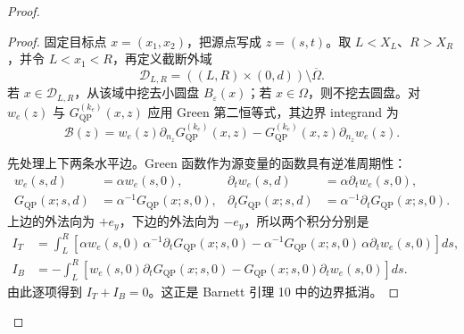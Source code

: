 \documentclass[UTF8,11pt,fontset=fandol]{ctexart}
\newcommand{\Om}{\Omega}
\newcommand{\QP}{\mathrm{QP}}
\theoremstyle{plain}
\theoremstyle{definition}
\theoremstyle{remark}
\begin{document}
\begin{proof}
\begin{proof}
固定目标点 \(x=(x_1,x_2)\)，把源点写成 \(z=(s,t)\)。取
\(L<X_L\)、\(R>X_R\)，并令 \(L<x_1<R\)，再定义截断外域
\[
\mathcal D_{L,R}=((L,R)\times(0,d))\setminus\overline\Om.
\]
若 \(x\in\mathcal D_{L,R}\)，从该域中挖去小圆盘 \(B_\varepsilon(x)\)；若
\(x\in\Om\)，则不挖去圆盘。对 \(w_e(z)\) 与
\(G_{\QP}^{(k_e)}(x,z)\) 应用 Green 第二恒等式，其边界 integrand 为
\[
\mathcal B(z)
=w_e(z)\partial_{n_z}G_{\QP}^{(k_e)}(x,z)
 -G_{\QP}^{(k_e)}(x,z)\partial_{n_z}w_e(z).
\]

先处理上下两条水平边。Green 函数作为源变量的函数具有逆准周期性：
\[
\begin{aligned}
w_e(s,d)&=\alpha w_e(s,0),
&\partial_t w_e(s,d)&=\alpha\partial_t w_e(s,0),\\
G_{\QP}(x;s,d)&=\alpha^{-1}G_{\QP}(x;s,0),
&\partial_tG_{\QP}(x;s,d)&=\alpha^{-1}\partial_tG_{\QP}(x;s,0).
\end{aligned}
\]
上边的外法向为 \(+e_y\)，下边的外法向为 \(-e_y\)，所以两个积分分别是
\[
\begin{aligned}
I_T
&=\int_L^R\left[
 \alpha w_e(s,0)\,\alpha^{-1}\partial_tG_{\QP}(x;s,0)
 -\alpha^{-1}G_{\QP}(x;s,0)\,\alpha\partial_tw_e(s,0)
 \right]ds,\\
I_B
&=-\int_L^R\left[
 w_e(s,0)\partial_tG_{\QP}(x;s,0)
 -G_{\QP}(x;s,0)\partial_tw_e(s,0)
 \right]ds.
\end{aligned}
\]
由此逐项得到 \(I_T+I_B=0\)。这正是 Barnett 引理 10 中的边界抵消。


\end{proof}
\end{proof}
\end{document}

